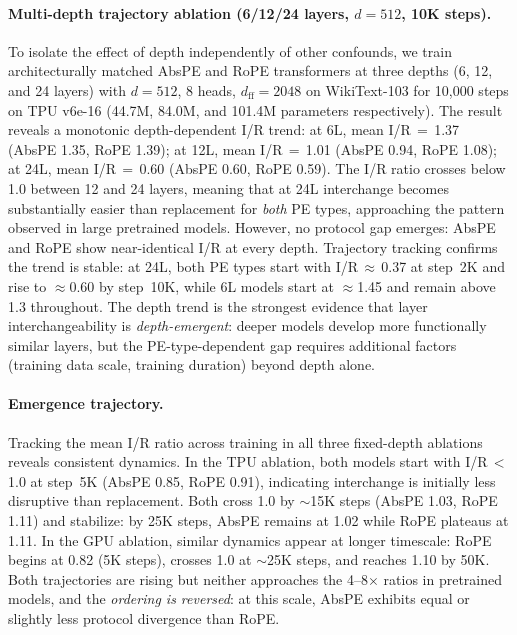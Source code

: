 \documentclass{article}
\begin{document}
\paragraph{Multi-depth trajectory ablation (6/12/24 layers, $d{=}512$, 10K steps).}
To isolate the effect of depth independently of other confounds, we train architecturally matched AbsPE and RoPE transformers at three depths (6, 12, and 24 layers) with $d{=}512$, 8 heads, $d_\text{ff}{=}2048$ on WikiText-103 for 10{,}000 steps on TPU v6e-16 (44.7M, 84.0M, and 101.4M parameters respectively). The result reveals a monotonic depth-dependent I/R trend: at 6L, mean I/R$\,{=}\,$1.37 (AbsPE 1.35, RoPE 1.39); at 12L, mean I/R$\,{=}\,$1.01 (AbsPE 0.94, RoPE 1.08); at 24L, mean I/R$\,{=}\,$0.60 (AbsPE 0.60, RoPE 0.59). The I/R ratio crosses below 1.0 between 12 and 24 layers, meaning that at 24L interchange becomes substantially easier than replacement for \emph{both} PE types, approaching the pattern observed in large pretrained models. However, no protocol gap emerges: AbsPE and RoPE show near-identical I/R at every depth. Trajectory tracking confirms the trend is stable: at 24L, both PE types start with I/R$\,{\approx}\,$0.37 at step~2K and rise to $\approx$0.60 by step~10K, while 6L models start at $\approx$1.45 and remain above 1.3 throughout. The depth trend is the strongest evidence that layer interchangeability is \emph{depth-emergent}: deeper models develop more functionally similar layers, but the PE-type-dependent gap requires additional factors (training data scale, training duration) beyond depth alone.

\paragraph{Emergence trajectory.}
Tracking the mean I/R ratio across training in all three fixed-depth ablations reveals consistent dynamics. In the TPU ablation, both models start with I/R$\,{<}\,$1.0 at step~5K (AbsPE 0.85, RoPE 0.91), indicating interchange is initially less disruptive than replacement. Both cross 1.0 by ${\sim}$15K steps (AbsPE 1.03, RoPE 1.11) and stabilize: by 25K steps, AbsPE remains at 1.02 while RoPE plateaus at 1.11. In the GPU ablation, similar dynamics appear at longer timescale: RoPE begins at 0.82 (5K steps), crosses 1.0 at ${\sim}$25K steps, and reaches 1.10 by 50K. Both trajectories are rising but neither approaches the 4--8$\times$ ratios in pretrained models, and the \emph{ordering is reversed}: at this scale, AbsPE exhibits equal or slightly less protocol divergence than RoPE.
\end{document}
